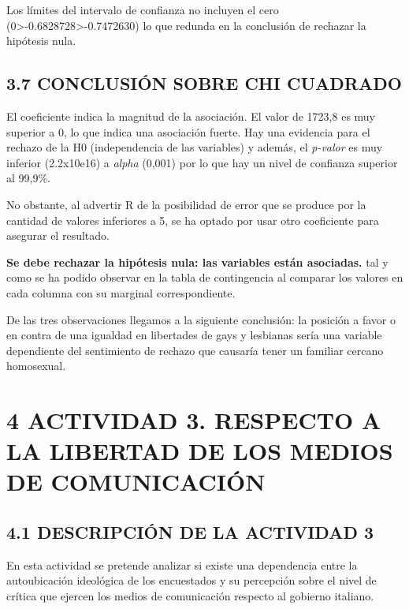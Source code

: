 \documentclass[
  12 pt,
  a4paper,
]{article}
\begin{document}
Los límites del intervalo de confianza no incluyen el cero
(0\textgreater-0.6828728\textgreater-0.7472630) lo que redunda en la
conclusión de rechazar la hipótesis nula.

\subsection{3.7 CONCLUSIÓN SOBRE CHI
CUADRADO}\label{conclusiuxf3n-sobre-chi-cuadrado}

El coeficiente indica la magnitud de la asociación. El valor de 1723,8
es muy superior a 0, lo que indica una asociación fuerte. Hay una
evidencia para el rechazo de la H0 (independencia de las variables) y
además, el \emph{p-valor} es muy inferior (2.2x10e16) a \emph{alpha}
(0,001) por lo que hay un nivel de confianza superior al 99,9\%.

No obstante, al advertir R de la posibilidad de error que se produce por
la cantidad de valores inferiores a 5, se ha optado por usar otro
coeficiente para asegurar el resultado.

\textbf{Se debe rechazar la hipótesis nula: las variables están
asociadas.} tal y como se ha podido observar en la tabla de contingencia
al comparar los valores en cada columna con su marginal correspondiente.

De las tres observaciones llegamos a la siguiente conclusión: la
posición a favor o en contra de una igualdad en libertades de gays y
lesbianas sería una variable dependiente del sentimiento de rechazo que
causaría tener un familiar cercano homosexual.

\newpage

\section{4 ACTIVIDAD 3. RESPECTO A LA LIBERTAD DE LOS MEDIOS DE
COMUNICACIÓN}\label{actividad-3.-respecto-a-la-libertad-de-los-medios-de-comunicaciuxf3n}

\subsection{4.1 DESCRIPCIÓN DE LA ACTIVIDAD
3}\label{descripciuxf3n-de-la-actividad-3}

En esta actividad se pretende analizar si existe una dependencia entre
la autoubicación ideológica de los encuestados y su percepción sobre el
nivel de crítica que ejercen los medios de comunicación respecto al
gobierno italiano.
\end{document}
